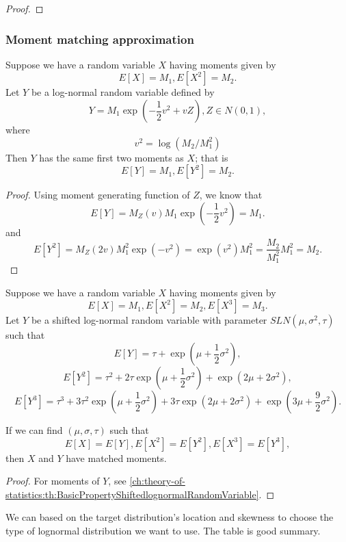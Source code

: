 \begin{refsection}
\begin{proof}
\end{proof}

\subsubsection{Moment matching approximation}
\begin{lemma}\label{ch:theory-of-statistics:th:lognormalApproximationViaMomentMatching}
Suppose we have a random variable $X$ having moments given by
$$E[X] = M_1, E[X^2] = M_2.$$
Let $Y$ be a log-normal random variable defined by
$$Y = M_1\exp(-\frac{1}{2}v^2 + vZ), Z\in N(0,1),$$
where 
$$v^2 = \log(M_2/M_1^2)$$
Then $Y$ has the same first two moments as $X$; that is
$$E[Y] = M_1, E[Y^2] = M_2.$$
\end{lemma}
\begin{proof}
Using moment generating function of $Z$, we know that
$$E[Y] = M_Z(v)M_1\exp(-\frac{1}{2}v^2) = M_1.$$
and
$$E[Y^2] = M_Z(2v)M_1^2\exp(-v^2) = \exp(v^2)M_1^2=\frac{M_2}{M_1^2}M_1^2 = M_2.$$
\end{proof}


\begin{lemma}\label{ch:theory-of-statistics:th:ShiftedlognormalApproximationViaMomentMatching}
	Suppose we have a random variable $X$ having moments given by
	$$E[X] = M_1, E[X^2] = M_2, E[X^3] = M_3.$$
	Let $Y$ be a  shifted log-normal random variable with parameter $SLN(\mu,\sigma^2,\tau)$ such that
	$$E[Y] = \tau + \exp(\mu+\frac{1}{2}\sigma^2),$$
	$$E[Y^2] = \tau^2 + 2\tau\exp(\mu+\frac{1}{2}\sigma^2)+\exp(2\mu+2\sigma^2),$$
	$$E[Y^3] = \tau^3 + 3\tau^2\exp(\mu+\frac{1}{2}\sigma^2)+3\tau\exp(2\mu+2\sigma^2)+\exp(3\mu+\frac{9}{2}\sigma^2).$$
	
	
If we can find $(\mu,\sigma,\tau)$ such that
$$E[X] = E[Y], E[X^2] = E[Y^2],E[X^3] = E[Y^3],$$
then $X$ and $Y$ have matched moments.

\end{lemma}
\begin{proof}
For moments of $Y$, see \autoref{ch:theory-of-statistics:th:BasicPropertyShiftedlognormalRandomVariable}.
\end{proof}

\begin{note}\cite{borovkova2007closed}
We can based on the target distribution's location and skewness to choose the type of lognormal distribution we want to use. The table is good summary.
	

\end{note}
\end{refsection}
